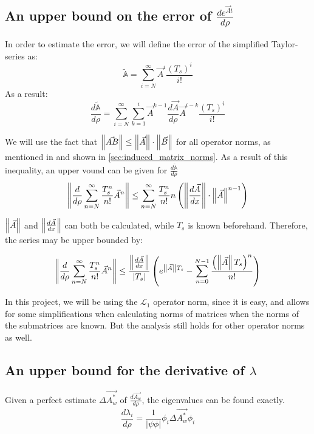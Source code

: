 \subsection{An upper bound on the error of \texorpdfstring{$\frac{d e^{\Vec{A}t}}{d\rho}$}{TEXT}}
\label{sec:upper_bound_norm_eAt}
In order to estimate the error, we will define the error of the simplified Taylor-series as: 
\begin{equation}
 \tilde{\mathbb{A}} = \sum_{i = N}^\infty \Vec{A}^{i}\frac{\left(T_s \right)^i }{i!}
\end{equation}
As a result: 
\begin{equation}
 \frac{d\tilde{\mathbb{A}}}{d\rho} = \sum_{i=N}^\infty \sum_{k=1}^i \Vec{A}^{k-1}\frac{d \Vec{A}}{d \rho}\Vec{A}^{i-k}\frac{\left(T_s \right)^i }{i!}
\end{equation}

We will use the fact that $\left\lVert\Vec{AB}\right\rVert\leq \left\lVert\Vec{A}\right\rVert \cdot \left\lVert\Vec{B}\right\rVert$ for all operator norms, as mentioned in \cite{Triangle_inequality_source} and shown in \cref{sec:induced_matrix_norms}. As a result of this inequality, an upper vound can be given for $\frac{d\tilde{\mathbb{A}}}{d\rho}$
\begin{equation}
 \left\lVert\frac{d}{d\rho} \sum_{n=N}^\infty \frac{T_s^n}{n!}\Vec{ A}^n\right\rVert \leq \sum_{n=N}^\infty \frac{T_s^n}{n!} n\left( \left\lVert\frac{d\Vec{ A}}{d x}\right\rVert \cdot \left\lVert\Vec{ A}\right\rVert^{n-1}\right)
\end{equation}{}

$\left\lVert\Vec{ A}\right\rVert$ and $\left\lVert\frac{d\Vec{ A}}{d x}\right\rVert$ can both be calculated, while $T_s$ is known beforehand. Therefore, the series may be upper bounded by: 

\begin{equation}
 \left\lVert\frac{d}{d\rho} \sum_{n=N}^\infty \frac{T_s^n}{n!}\Vec{ A}^n\right\rVert \leq \frac{\left\lVert\frac{d\Vec{ A}}{d x}\right\rVert}{|T_s|} \left( e^{\left\lVert\Vec{A}\right\rVert T_s} - \sum_{n=0}^{N-1} \frac{\left(\left\lVert\Vec{A}\right\rVert T_s \right)^n}{n!}\right)
 \label{eq:upper_bound_deAt}
\end{equation}{}

In this project, we will be using the $\mathcal{L}_1$ operator norm, since it is easy, and allows for some simplifications when calculating norms of matrices when the norms of the submatrices are known. But the analysis still holds for other operator norms as well. 

\subsection{An upper bound for the derivative of \texorpdfstring{$\lambda$}{TEXT}}
Given a perfect estimate $\Delta\Vec{A_w^*}$ of $\frac{d \Vec{A_w}}{d\rho}$, the eigenvalues can be found exactly. 
\begin{equation} 
 \frac{d \lambda_{i}}{d \rho} = \frac{1}{|\psi\phi|} \phi_i \Delta\Vec{A_w^*} \phi_i 
\end{equation}{}

